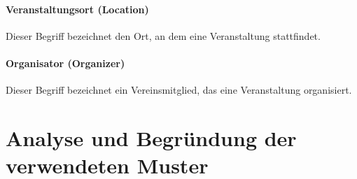 \paragraph{\glqq Veranstaltungsort\grqq{} (Location)}
Dieser Begriff bezeichnet den Ort, an dem eine Veranstaltung stattfindet.

\paragraph{\glqq Organisator\grqq{} (Organizer)}
Dieser Begriff bezeichnet ein Vereinsmitglied, das eine Veranstaltung organisiert.

\section{Analyse und Begründung der verwendeten Muster}
\label{section:analyse_und_begrundung_der_verwendeten_muster}